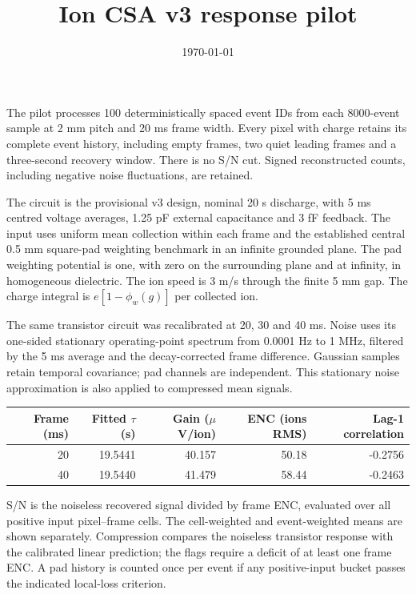 \documentclass[10pt,a4paper]{article}
\title{Ion CSA v3 response pilot}
\date{\today}
\begin{document}
\maketitle
The pilot processes 100 deterministically spaced event IDs from each 8000-event
sample at 2 mm pitch and 20 ms frame width. Every pixel with charge retains its
complete event history, including empty frames, two quiet leading frames and a
three-second recovery window. There is no S/N cut. Signed reconstructed counts,
including negative noise fluctuations, are retained.

The circuit is the provisional v3 design, nominal 20 s discharge, with 5 ms
centred voltage averages, 1.25 pF external capacitance and 3 fF feedback. The input
uses uniform mean collection within each frame and the established central
0.5 mm square-pad weighting benchmark in an infinite grounded plane. The pad
weighting potential is one, with zero on the surrounding plane and at infinity,
in homogeneous dielectric. The ion speed is 3 m/s through the finite 5 mm gap.
The charge integral is $e[1-\phi_w(g)]$ per collected ion.

The same transistor circuit was recalibrated at 20, 30 and 40 ms. Noise uses its
one-sided stationary operating-point spectrum from 0.0001 Hz to 1 MHz, filtered
by the 5 ms average and the decay-corrected frame difference. Gaussian samples
retain temporal covariance; pad channels are independent. This stationary noise
approximation is also applied to compressed mean signals.
\begin{center}\begin{tabular}{rrrrr}\toprule
Frame (ms) & Fitted $\tau$ (s) & Gain ($\mu$V/ion) & ENC (ions RMS) & Lag-1 correlation\\\midrule
20 & 19.5441 & 40.157 & 50.18 & -0.2756 \\
40 & 19.5440 & 41.479 & 58.44 & -0.2463 \\
\bottomrule\end{tabular}\end{center}

S/N is the noiseless recovered signal divided by frame ENC, evaluated over all
positive input pixel--frame cells. The cell-weighted and event-weighted means
are shown separately. Compression compares the noiseless transistor response
with the calibrated linear prediction; the flags require a deficit of at least
one frame ENC. A pad history is counted once per event if any positive-input
bucket passes the indicated local-loss criterion.
\end{document}
